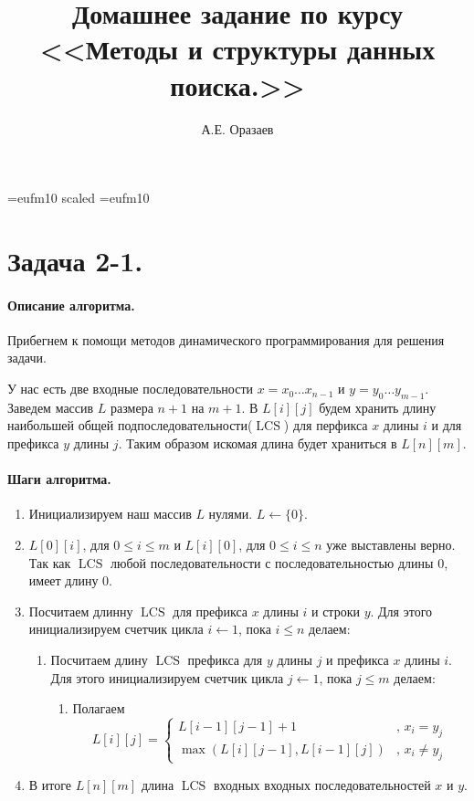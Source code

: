 \documentclass[12pt]{article}
\title{\bf Домашнее задание по курсу \\ <<Методы
и структуры данных поиска.>>}
\author{А.Е. Оразаев}
\date{}
\newcommand{\LCS}{\operatorname{LCS}}
\begin{document}
\voffset=-20mm 
\hoffset=-12mm
\font\Got=eufm10 scaled \font\Got=eufm10

\maketitle

\section{Задача 2-1.}
\paragraph{Описание алгоритма.}
Прибегнем к помощи методов динамического программирования для решения задачи.

У нас есть две входные последовательности $ x = x_0 \dots x_{n - 1} $ и
$ y = y_0 \dots y_{m - 1} $. Заведем массив $ L $ размера $ n + 1 $ на
$ m + 1 $. В $ L[i][j] $ будем хранить длину наибольшей общей 
подпоследовательности($ \LCS $) для перфикса $ x $ длины $ i $ и для префикса $ y $
длины $ j $. Таким образом искомая длина будет храниться в $ L[n][m] $.

\paragraph{Шаги алгоритма.}
\begin{enumerate}
    \item Инициализируем наш массив $ L $ нулями. $ L \leftarrow \{0\} $.

    \item $ L[0][i] $, для $ 0 \le i \le m $ и $ L[i][0] $, для $ 0 \le i \le n $ 
    уже выставлены верно. Так как $ \LCS $ любой
    последовательности с последовательностью длины 0, имеет длину 0.

    \item Посчитаем длинну $ \LCS $ для префикса $ x $
    длины $ i $ и строки $ y $. Для этого инициализируем счетчик цикла 
    $ i \leftarrow 1 $, пока $ i \le n $ делаем:
    \begin{enumerate}
        \item Посчитаем длину $ \LCS $ префикса для 
        $ y $ длины $ j $ и префикса $ x $ длины $ i $. Для этого инициализируем
        счетчик цикла $ j \leftarrow 1 $, пока $ j \le m $ делаем:
        \begin{enumerate}
            \item Полагаем 
            $$ L[i][j] = \left\{ 
                \begin{array}{ll}
                    L[i - 1][j - 1] + 1 &\mbox{, } x_i = y_j \\
                    \max(L[i][j - 1], L[i - 1][j]) &\mbox{, } x_i \ne y_j
                \end{array}
            \right.$$
        \end{enumerate}
    \end{enumerate}

    \item В итоге $ L[n][m] $ длина $ \LCS $ входных
    входных последовательностей $ x $ и $ y $.
\end{enumerate}
\end{document}
